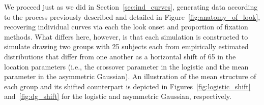 \documentclass{article}
\begin{document}
We proceed just as we did in Section~\ref{sec:ind_curves}, generating data according to the process previously described and detailed in Figure~\ref{fig:anatomy_of_look}, recovering individual curves via each the look onset and proportion of fixation methods. What differs here, however, is that each simulation is constructed to simulate drawing two groups with 25 subjects each from empirically estimated distributions that differ from one another as a horizontal shift of 65 in the location parameters (i.e., the crossover parameter in the logistic and the mean parameter in the asymmetric Gaussian). An illustration of the mean structure of each group and its shifted counterpart is depicted in Figures~\ref{fig:logistic_shift} and~\ref{fig:dg_shift} for the logistic and asymmetric Gaussian, respectively.

\begin{figure}[H]
    \centering

\end{figure}
\end{document}
